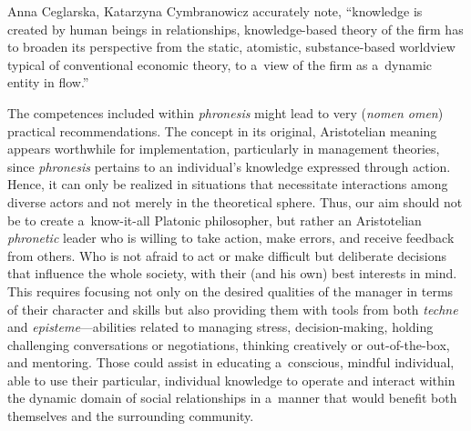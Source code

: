 \begin{artengenv2auth}{Anna Ceglarska, Katarzyna Cymbranowicz}
\parencite*[][p.242]{nonaka_managing_2008} %
 accurately note, ``knowledge is created by human beings in relationships, knowledge-based theory of the firm has to broaden its perspective from the static, atomistic, substance-based worldview typical of conventional economic theory, to a~view of the firm as a~dynamic entity in flow.''



The competences included within \textit{phronesis} might lead to very (\textit{nomen omen}) practical recommendations. The concept in its original, Aristotelian meaning appears worthwhile for implementation, particularly in management theories, since \textit{phronesis} pertains to an individual's knowledge expressed through action. Hence, it can only be realized in situations that necessitate interactions among diverse actors and not merely in the theoretical sphere. Thus, our aim should not be to create a~know-it-all Platonic philosopher, but rather an Aristotelian \textit{phronetic} leader who is willing to take action, make errors, and receive feedback from others. Who is not afraid to act or make difficult but deliberate decisions that influence the whole society, with their (and his own) best interests in mind. This requires focusing not only on the desired qualities of the manager in terms of their character and skills but also providing them with tools from both \textit{techne} and \textit{episteme}---abilities related to managing stress, decision-making, holding challenging conversations or negotiations, thinking creatively or out-of-the-box, and mentoring. Those could assist in educating a~conscious, mindful individual, able to use their particular, individual knowledge to operate and interact within the dynamic domain of social relationships in a~manner that would benefit both themselves and the surrounding community.



\end{artengenv2auth}



